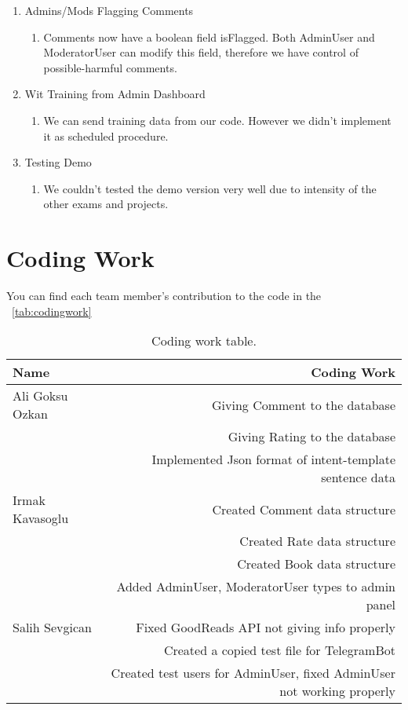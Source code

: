 \documentclass[a4paper]{article}
\begin{document}
\begin{enumerate}
 	\item 	Admins/Mods Flagging Comments
 	\begin{enumerate}
 \item  Comments now have a boolean field isFlagged. Both AdminUser and ModeratorUser can modify this field, therefore we have control of possible-harmful comments.
 	\end{enumerate}
 	\item	Wit Training from Admin Dashboard
 	\begin{enumerate}
 \item	We can send training data from our code. However we didn't implement it as scheduled procedure.
 		\end{enumerate}
  \item	Testing Demo
    \begin{enumerate}
 	  \item  We couldn't tested the demo version very well due to intensity of the other exams and projects.
 	 \end{enumerate}
 \end{enumerate}
\section{Coding Work}
You can find each team member's contribution to the code in the ~\autoref{tab:codingwork}

\begin{table}[!hb]
\centering
\begin{tabular}{l|r}
Name & Coding Work \\\hline
Ali Goksu Ozkan & Giving Comment to the database \\
& Giving Rating to the database \\
& Implemented Json format of intent-template sentence data \\\hline
Irmak Kavasoglu & Created Comment data structure \\
& Created Rate data structure \\
& Created Book data structure \\
& Added AdminUser, ModeratorUser types to admin panel \\\hline
Salih Sevgican & Fixed GoodReads API not giving info properly \\
& Created a copied test file for TelegramBot \\
& Created test users for AdminUser, fixed AdminUser not working properly
\end{tabular}
\caption{\label{tab:codingwork}Coding work table.}
\end{table}
\end{document}
